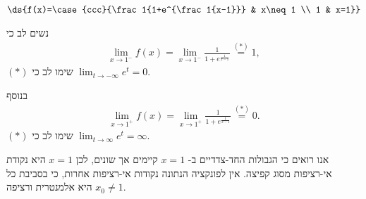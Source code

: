 \item $\ds{f(x)=\case{ccc}{\frac1{1+e^{\frac1{x-1}}} & x\neq 1 \\ 1 & x=1}}$
\begin{solbox}
נשים לב כי
\begin{align*}
    \lim_{x\to1^-}f(x)= \lim_{x\to1^-}\frac1{1+e^{\frac1{x-1}}}
    \overset{(\ast)}{=} 1,
\end{align*}
$(\ast)$
שימו לב כי
$\displaystyle\lim_{t\to-\infty}e^t=0$.

בנוסף
\begin{align*}
    \lim_{x\to1^+}f(x)= \lim_{x\to1^+}\frac1{1+e^{\frac1{x-1}}}
    \overset{(\ast)}{=} 0.
\end{align*}
$(\ast)$
שימו לב כי
$\displaystyle\lim_{t\to\infty}e^t=\infty$.

אנו רואים כי הגבולות החד-צדדיים ב-
$x=1$
קיימים אך שונים,
לכן
$x=1$
היא נקודת אי-רציפות מסוג קפיצה.
אין לפונקציה הנתונה נקודות אי-רציפות אחרות,
כי בסביבת כל
$x_0\neq 1$
היא אלמנטרית ורציפה.
\end{solbox}
\eE
